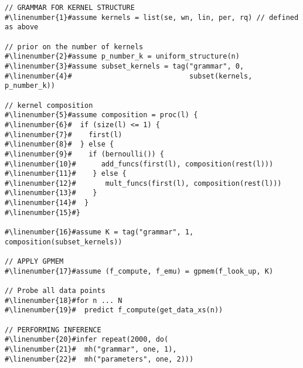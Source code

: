 \begin{mdframed}
\begin{minipage}{\linewidth}
\small
\belowcaptionskip=-10pt
\begin{lstlisting}[mathescape,label=alg:structureVent,basicstyle=\selectfont\ttfamily,numbers=none,caption={Structure
Learning},escapechar=\#]
// GRAMMAR FOR KERNEL STRUCTURE
#\linenumber{1}#assume kernels = list(se, wn, lin, per, rq) // defined as above

// prior on the number of kernels
#\linenumber{2}#assume p_number_k = uniform_structure(n)
#\linenumber{3}#assume subset_kernels = tag("grammar", 0,
#\linenumber{4}#                            subset(kernels, p_number_k))

// kernel composition
#\linenumber{5}#assume composition = proc(l) {
#\linenumber{6}#  if (size(l) <= 1) {
#\linenumber{7}#    first(l)
#\linenumber{8}#  } else {
#\linenumber{9}#    if (bernoulli()) {
#\linenumber{10}#      add_funcs(first(l), composition(rest(l)))
#\linenumber{11}#    } else {
#\linenumber{12}#       mult_funcs(first(l), composition(rest(l)))
#\linenumber{13}#    }
#\linenumber{14}#  }
#\linenumber{15}#}

#\linenumber{16}#assume K = tag("grammar", 1, composition(subset_kernels))

// APPLY GPMEM
#\linenumber{17}#assume (f_compute, f_emu) = gpmem(f_look_up, K)

// Probe all data points
#\linenumber{18}#for n ... N
#\linenumber{19}#  predict f_compute(get_data_xs(n))

// PERFORMING INFERENCE
#\linenumber{20}#infer repeat(2000, do(
#\linenumber{21}#  mh("grammar", one, 1),
#\linenumber{22}#  mh("parameters", one, 2)))
\end{lstlisting}

\end{minipage}
\end{mdframed}
